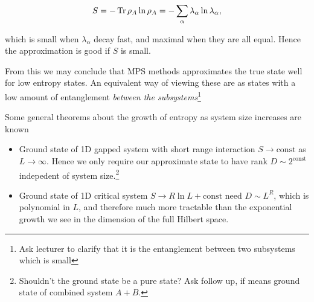 \documentclass[a4paper]{article}
\begin{document}
\[S= - \operatorname{Tr} \rho_A\ln \rho_A=-\sum_\alpha \lambda_\alpha \ln \lambda_\alpha,\]


which is small when $\lambda_\alpha$ decay fast, and maximal when they are all
equal. Hence the approximation is good if $S$ is small.
\begin{remark}
From this we may conclude that MPS methods approximates the true state well for
low entropy states. An equivalent way of viewing these are as states with a low
amount of entanglement \emph{between the subsystems}\footnote{Ask lecturer to
clarify that it is the entanglement between two subsystems which is small}
\end{remark}
\begin{remark}
Some general theorems about the growth of entropy as system size increases are
known
\begin{itemize}
    \item  Ground state of 1D gapped system with short range interaction $S\to
    \mathrm{const}$ as $L\to \infty$. Hence we only require our approximate
    state to have rank $D\sim 2^\mathrm{const}$ indepedent of system size.\footnote{Shouldn't the
    ground state be a pure state? Ask follow up, if means ground state of
combined system $A+B$.}
    \item  Ground state of 1D critical system $S\to R \ln L+\mathrm{const}$ need $D\sim
        L^R$, which is polynomial in $L$, and therefore much more tractable than
        the exponential growth we see in the dimension of the full Hilbert
        space. 
\end{itemize}
\end{remark}
\end{document}
